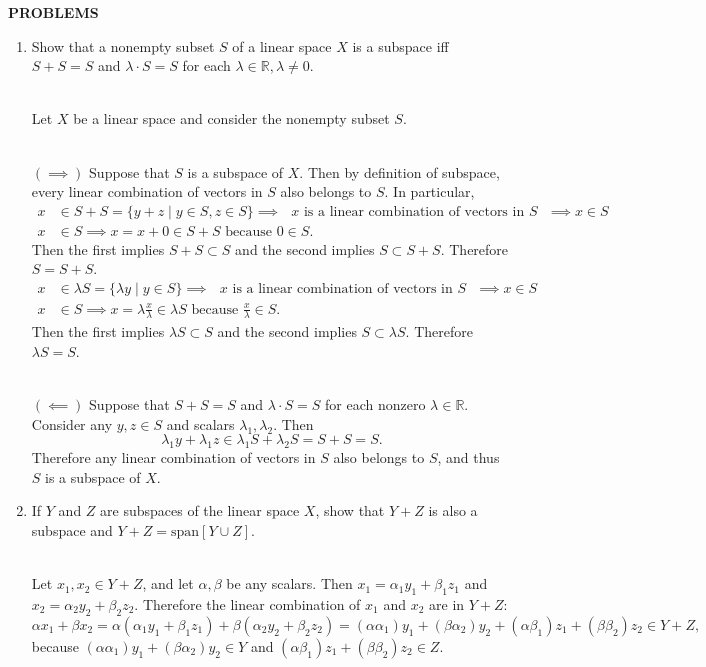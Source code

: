 \begin{center}
	\textbf{PROBLEMS}
\end{center}
\begin{enumerate}
	\setcounter{enumi}{0}
    \item Show that a nonempty subset $S$ of a linear space $X$ is a subspace iff $S+S=S$ and $\lambda \cdot S=S$ for each $\lambda\in\mathbb{R},\lambda\neq0$.
    
    \ \\Let $X$ be a linear space and consider the nonempty subset $S$.

    \ \\$(\implies)$ Suppose that $S$ is a subspace of $X$.
    Then by definition of subspace, every linear combination of vectors in $S$ also belongs to $S$.
    In particular, 
    \begin{align*}
        x&\in S+S=\{y+z\mid y\in S,z\in S\}\implies \text{ $x$ is a linear combination of vectors in $S$ }\implies x\in S\\
        x&\in S\implies x=x+0\in S+S\text{ because }0\in S.
    \end{align*}
    Then the first implies $S+S\subset S$ and the second implies $S\subset S+S$.
    Therefore $S=S+S$.
    \begin{align*}
        x&\in \lambda S=\{\lambda y\mid y\in S\}\implies \text{ $x$ is a linear combination of vectors in $S$ }\implies x\in S\\
        x&\in S\implies x=\lambda \frac{x}{\lambda}\in \lambda S\text{ because }\frac{x}{\lambda}\in S.
    \end{align*}
    Then the first implies $\lambda S\subset S$ and the second implies $S\subset \lambda S$.
    Therefore $\lambda S=S$.

    \ \\$(\impliedby)$ Suppose that $S+S=S$ and $\lambda\cdot S=S$ for each nonzero $\lambda\in\mathbb{R}$.
    Consider any $y,z\in S$ and scalars $\lambda_1,\lambda_2$. 
    Then 
    \[
        \lambda_1 y+\lambda_1z\in \lambda_1 S+\lambda_2 S=S+S=S.
    \]
    Therefore any linear combination of vectors in $S$ also belongs to $S$, and thus $S$ is a subspace of $X$.
    \ \\\item If $Y$ and $Z$ are subspaces of the linear space $X$, show that $Y+Z$ is also a subspace and $Y+Z=\text{span}[Y\cup Z]$. 

    \ \\Let $x_1,x_2\in Y+Z$, and let $\alpha,\beta$ be any scalars.
    Then $x_1=\alpha_1y_1+\beta_1z_1$ and $x_2=\alpha_2y_2+\beta_2z_2$.
    Therefore the linear combination of $x_1$ and $x_2$ are in $Y+Z$:
    \[
        \alpha x_1+\beta x_2
        =\alpha(\alpha_1y_1+\beta_1z_1)+\beta(\alpha_2y_2+\beta_2z_2)
        =(\alpha\alpha_1)y_1+(\beta\alpha_2)y_2+(\alpha\beta_1)z_1+(\beta\beta_2)z_2
        \in Y+Z,
    \]
    because $(\alpha\alpha_1)y_1+(\beta\alpha_2)y_2\in Y$ and $(\alpha\beta_1)z_1+(\beta\beta_2)z_2\in Z$.


\end{enumerate}
